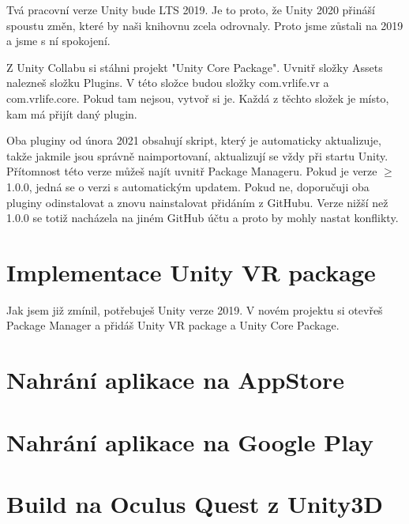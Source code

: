 \documentclass{article}
\begin{document}
Tvá pracovní verze Unity bude LTS 2019. Je to proto, že Unity 2020 přináší spoustu změn, které by naši knihovnu zcela odrovnaly. Proto jsme zůstali na 2019 a jsme s ní spokojení.

Z Unity Collabu si stáhni projekt "Unity Core Package". Uvnitř složky Assets nalezneš složku Plugins. V této složce budou složky com.vrlife.vr a com.vrlife.core. Pokud tam nejsou, vytvoř si je. Každá z těchto složek je místo, kam má přijít daný plugin.

Oba pluginy od února 2021 obsahují skript, který je automaticky aktualizuje, takže jakmile jsou správně naimportovaní, aktualizují se vždy při startu Unity. Přítomnost této verze můžeš najít uvnitř Package Manageru. Pokud je verze $\geq$ 1.0.0, jedná se o verzi s automatickým updatem. Pokud ne, doporučuji oba pluginy odinstalovat a znovu nainstalovat přidáním z GitHubu. Verze nižší než 1.0.0 se totiž nacházela na jiném GitHub účtu a proto by mohly nastat konflikty.
\pagebreak

\section{Implementace Unity VR package}
Jak jsem již zmínil, potřebuješ Unity verze 2019. V novém projektu si otevřeš Package Manager a přidáš Unity VR package a Unity Core Package.

\pagebreak

\section{Nahrání aplikace na AppStore}
\pagebreak

\section{Nahrání aplikace na Google Play}
\pagebreak

\section{Build na Oculus Quest z Unity3D}
\pagebreak
\end{document}
